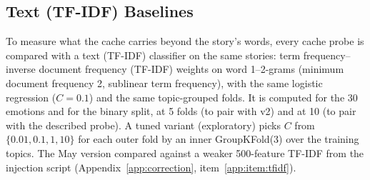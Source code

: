 \documentclass[11pt,a4paper]{article}
\begin{document}
\subsection{Text (TF-IDF) Baselines}
\label{sec:text_baseline_method}

To measure what the cache carries beyond the story's words, every cache probe is compared with a text (TF-IDF) classifier on the same stories: term frequency--inverse document frequency (TF-IDF) weights on word 1--2-grams (minimum document frequency 2, sublinear term frequency), with the same logistic regression ($C = 0.1$) and the same topic-grouped folds. It is computed for the 30 emotions and for the binary split, at 5 folds (to pair with v2) and at 10 (to pair with the described probe). A tuned variant (exploratory) picks $C$ from $\{0.01, 0.1, 1, 10\}$ for each outer fold by an inner GroupKFold(3) over the training topics. The May version compared against a weaker 500-feature TF-IDF from the injection script (Appendix~\ref{app:correction}, item~\ref{app:item:tfidf}).
\end{document}
